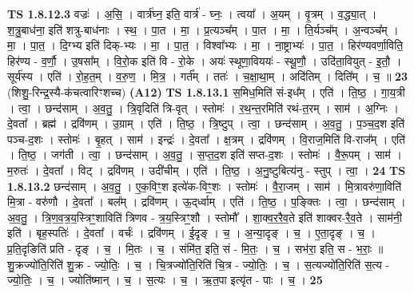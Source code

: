 \documentclass[17pt]{extarticle}
\begin{document}
                  \newline
                                \textbf{ TS 1.8.12.3} \newline
                  वज्रः॑ । अ॒सि॒ । वार्त्र॑घ्न॒ इति॒ वार्त्र॑ - घ्नः॒ । त्वया᳚ । अ॒यम् । वृ॒त्रम् । व॒द्ध्या॒त् । श॒त्रु॒बाध॑ना॒ इति॑ शत्रु-बाध॑नाः । स्थ॒ । पा॒त । मा॒ । प्र॒त्यञ्च᳚म् । पा॒त । मा॒ । ति॒र्यञ्च᳚म् । अ॒न्वञ्च᳚म् । मा॒ । पा॒त॒ । दि॒ग्भ्य इति॑ दिक्-भ्यः । मा॒ । पा॒त॒ । विश्वा᳚भ्यः । मा॒ । ना॒ष्ट्राभ्यः॑ । पा॒त॒ । हिर॑ण्यवर्णा॒विति॒ हिर॑ण्य - व॒र्णौ॒ । उ॒षसा᳚म् । वि॒रो॒क इति॑ वि - रो॒के । अयः॑ स्थूणा॒विययः॑ - स्थू॒णौ॒ । उदि॑ता॒वियुत् - इ॒तौ॒ । सूर्य॑स्य । एति॑ । रो॒ह॒त॒म् । व॒रु॒ण॒ । मि॒त्र॒ । गर्त᳚म् । ततः॑ । च॒क्षा॒था॒म् । अदि॑तिम् । दिति᳚म् । च॒ ॥ \textbf{  23} \newline
                  \newline
                      (शिशु॒-रिन्द्र॒स्यै-क॑चत्वारिꣳशच्च)  \textbf{(A12)} \newline \newline
                                \textbf{ TS 1.8.13.1} \newline
                  स॒मिध॒मिति॑ सं-इध᳚म् । एति॑ । ति॒ष्ठ॒ । गा॒य॒त्री । त्वा॒ । छन्द॑साम् । अ॒व॒तु॒ । त्रि॒वृदिति॑ त्रि-वृत् । स्तोमः॑ । र॒थ॒न्त॒रमिति॑ रथं-त॒रम् । साम॑ । अ॒ग्निः । दे॒वता᳚ । ब्रह्म॑ । द्रवि॑णम् । उ॒ग्राम् । एति॑ । ति॒ष्ठ॒ । त्रि॒ष्टुप् । त्वा॒ । छन्द॑साम् । अ॒व॒तु॒ । प॒ञ्च॒द॒श इति॑ पञ्च-द॒शः । स्तोमः॑ । बृ॒हत् । साम॑ । इन्द्रः॑ । दे॒वता᳚ । क्ष॒त्रम् । द्रवि॑णम् । वि॒राज॒मिति॑ वि-राज᳚म् । एति॑ । ति॒ष्ठ॒ । जग॑ती । त्वा॒ । छन्द॑साम् । अ॒व॒तु॒ । स॒प्त॒द॒श इति॑ सप्त-द॒शः । स्तोमः॑ । वै॒रू॒पम् । साम॑ । म॒रुतः॑ । दे॒वता᳚ । विट् । द्रवि॑णम् । उदी॑चीम् । एति॑ । ति॒ष्ठ॒ । अ॒नु॒ष्टुबित्य॑नु - स्तुप् । त्वा॒ । \textbf{  24} \newline
                  \newline
                                \textbf{ TS 1.8.13.2} \newline
                  छन्द॑साम् । अ॒व॒तु॒ । ए॒क॒विꣳ॒॒श इत्ये॑क-विꣳ॒॒शः । स्तोमः॑ । वै॒रा॒जम् । साम॑ । मि॒त्रावरु॑णा॒विति॑ मि॒त्रा - वरु॑णौ । दे॒वता᳚ । बल᳚म् । द्रवि॑णम् । ऊ॒द्‌र्ध्वाम् । एति॑ । ति॒ष्ठ॒ । प॒ङ्क्तिः । त्वा॒ । छन्द॑साम् । अ॒व॒तु॒ । त्रि॒ण॒व॒त्र॒य॒स्त्रिꣳ॒॒शाविति॑ त्रिणव - त्र॒य॒स्त्रिꣳ॒॒शौ । स्तोमौ᳚ । शा॒क्व॒र॒रै॒व॒ते इति॑ शाक्वर-रै॒व॒ते । साम॑नी॒ इति॑ । बृह॒स्पतिः॑ । दे॒वता᳚ । वर्चः॑ । द्रवि॑णम् । ई॒दृङ् । च॒ । अ॒न्या॒दृङ् । च॒ । ए॒ता॒दृङ् । च॒ । प्र॒ति॒दृङिति॑ प्रति - दृङ् । च॒ । मि॒तः । च॒ । संमि॑त॒ इति॒ सं - मि॒तः॒ । च॒ । सभ॑रा॒ इति॒ स - भ॒राः॒ ॥ शु॒क्रज्यो॑ति॒रिति॑ शु॒क्र - ज्यो॒तिः॒ । च॒ । चि॒त्रज्यो॑ति॒रिति॑ चि॒त्र - ज्यो॒तिः॒ । च॒ । स॒त्यज्यो॑ति॒रिति॑ स॒त्य - ज्यो॒तिः॒ । च॒ । ज्योति॑ष्मान् । च॒ । स॒त्यः । च॒ । ऋ॒त॒पा इत्यृ॑त - पाः । च॒ । \textbf{  25} \newline
\end{document}
